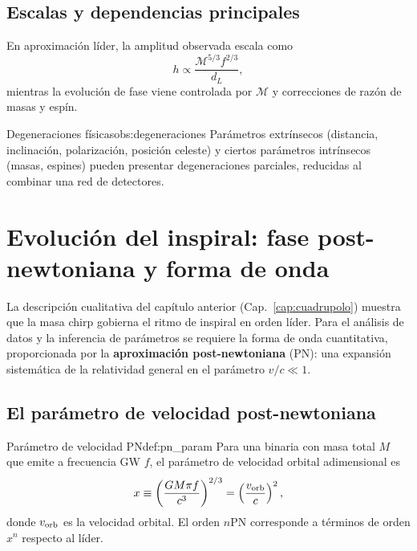 \subsection{Escalas y dependencias principales}

En aproximación líder, la amplitud observada escala como
\begin{equation}
h \propto \frac{\mathcal{M}^{5/3} f^{2/3}}{d_L},
\end{equation}
mientras la evolución de fase viene controlada por $\mathcal{M}$ y correcciones de razón de masas y espín.

\begin{observacion}{Degeneraciones físicas}{obs:degeneraciones}
Parámetros extrínsecos (distancia, inclinación, polarización, posición celeste) y ciertos parámetros intrínsecos (masas, espines) pueden presentar degeneraciones parciales, reducidas al combinar una red de detectores.
\end{observacion}

\section{Evolución del inspiral: fase post-newtoniana y forma de onda}
\label{sec:pn_waveform}

La descripción cualitativa del capítulo anterior (Cap.~\ref{cap:cuadrupolo}) muestra que la masa chirp gobierna el ritmo de inspiral en orden líder. Para el análisis de datos y la inferencia de parámetros se requiere la forma de onda cuantitativa, proporcionada por la \textbf{aproximación post-newtoniana} (PN): una expansión sistemática de la relatividad general en el parámetro $v/c \ll 1$.

\subsection{El parámetro de velocidad post-newtoniana}

\begin{definicion}{Parámetro de velocidad PN}{def:pn_param}
Para una binaria con masa total $M$ que emite a frecuencia GW $f$, el parámetro de velocidad orbital adimensional es
\begin{equation}
  x \equiv \left(\frac{G M \pi f}{c^3}\right)^{2/3} = \left(\frac{v_{\rm orb}}{c}\right)^2,
  \label{eq:pn_x}
\end{equation}
donde $v_{\rm orb}$ es la velocidad orbital. El orden $n$PN corresponde a términos de orden $x^n$ respecto al líder.
\end{definicion}

